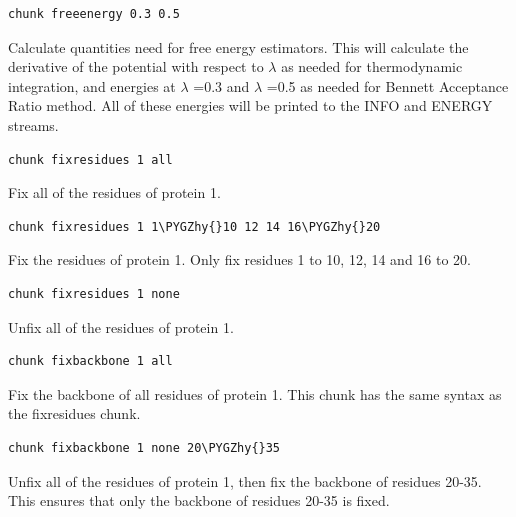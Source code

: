 \documentclass[letterpaper,10pt,english]{sphinxmanual}
\def\PYGZhy{\char`\-}
\begin{document}
\begin{Verbatim}[frame=single,commandchars=\\\{\}]
chunk freeenergy 0.3 0.5
\end{Verbatim}

Calculate quantities need for free energy estimators. This will calculate the derivative of the potential with respect to \(\lambda\) as needed for thermodynamic integration, and energies at \(\lambda\) =0.3 and \(\lambda\) =0.5 as needed for Bennett Acceptance Ratio method. All of these energies will be printed to the INFO and ENERGY streams.

\begin{Verbatim}[frame=single,commandchars=\\\{\}]
chunk fixresidues 1 all
\end{Verbatim}

Fix all of the residues of protein 1.

\begin{Verbatim}[frame=single,commandchars=\\\{\}]
chunk fixresidues 1 1\PYGZhy{}10 12 14 16\PYGZhy{}20
\end{Verbatim}

Fix the residues of protein 1. Only fix residues 1 to 10, 12, 14 and 16 to 20.

\begin{Verbatim}[frame=single,commandchars=\\\{\}]
chunk fixresidues 1 none
\end{Verbatim}

Unfix all of the residues of protein 1.

\begin{Verbatim}[frame=single,commandchars=\\\{\}]
chunk fixbackbone 1 all
\end{Verbatim}

Fix the backbone of all residues of protein 1. This chunk has the same syntax as the fixresidues chunk.

\begin{Verbatim}[frame=single,commandchars=\\\{\}]
chunk fixbackbone 1 none 20\PYGZhy{}35
\end{Verbatim}

Unfix all of the residues of protein 1, then fix the backbone of residues 20-35. This ensures that only the backbone of residues 20-35 is fixed.
\end{document}
